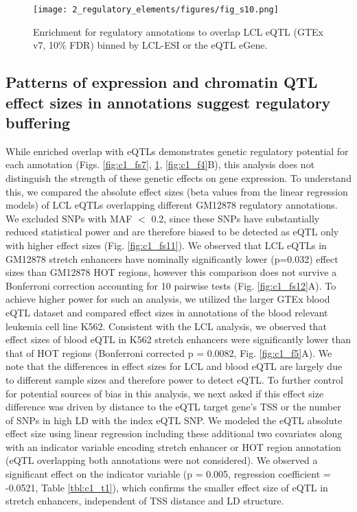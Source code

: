 \begin{figure}
    \centering
    \texttt{[image: 2\_regulatory\_elements/figures/fig\_s10.png]}
    \caption{Enrichment for regulatory annotations to overlap LCL eQTL (GTEx v7, 10\% FDR) binned by LCL-ESI or the eQTL eGene.}
    \label{fig:c1_fs10}
\end{figure}

\subsection{Patterns of expression and chromatin QTL effect sizes in annotations suggest regulatory buffering}
While enriched overlap with eQTLs demonstrates genetic regulatory potential for each annotation (Figs. \ref{fig:c1_fs7}, \ref{fig:c1_fs10}, \ref{fig:c1_f4}B), this analysis does not distinguish the strength of these genetic effects on gene expression. To understand this, we compared the absolute effect sizes (beta values from the linear regression models) of LCL eQTLs overlapping different GM12878 regulatory annotations. We excluded SNPs with \ac{MAF} $<$ 0.2, since these SNPs have substantially reduced statistical power and are therefore biased to be detected as eQTL only with higher effect sizes (Fig. \ref{fig:c1_fs11}). We observed that LCL eQTLs in GM12878 stretch enhancers have nominally significantly lower (p=0.032) effect sizes than GM12878 HOT regions, however this comparison does not survive a Bonferroni correction accounting for 10 pairwise tests (Fig. \ref{fig:c1_fs12}A). To achieve higher power for such an analysis, we utilized the larger GTEx blood eQTL dataset and compared effect sizes in annotations of the blood relevant leukemia cell line K562. Consistent with the LCL analysis, we observed that effect sizes of blood eQTL in K562 stretch enhancers were significantly lower than that of HOT regions (Bonferroni corrected p = 0.0082, Fig. \ref{fig:c1_f5}A). We note that the differences in effect sizes for LCL and blood eQTL are largely due to different sample sizes and therefore power to detect eQTL. To further control for potential sources of bias in this analysis, we next asked if this effect size difference was driven by distance to the eQTL target gene’s TSS or the number of SNPs in high \ac{LD} with the index eQTL SNP. We modeled the eQTL absolute effect size using linear regression including these additional two covariates along with an indicator variable encoding stretch enhancer or HOT region annotation (eQTL overlapping both annotations were not considered). We observed a significant effect on the indicator variable (p = 0.005, regression coefficient = -0.0521, Table \ref{tbl:c1_t1}), which confirms the smaller effect size of eQTL in stretch enhancers, independent of TSS distance and LD structure. \\

